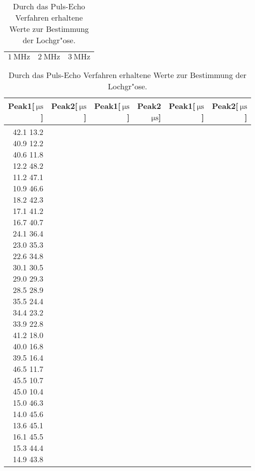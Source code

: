 
\begin{table}[!h]
\begin{center}
\begin{tabular}{|l|l|l|}
\hline
 $\SI{1}{\mega\hertz}$ & $\SI{2}{\mega\hertz}$ & $\SI{3}{\mega\hertz}$\\
\hline
\hline

\hline
\end{tabular}
\begin{tabular}{|r|r|r|r|r|r|}
\hline
Peak1[$\SI{}{\micro\second}$] & Peak2[$\SI{}{\micro\second}$] & Peak1[$\SI{}{\micro\second}$] & Peak2$\SI{}{\micro\second}$] & Peak1[$\SI{}{\micro\second}$] & Peak2[$\SI{}{\micro\second}$]\\
\hline
\hline
42.1 	13.2 	40.9 	12.2 	40.6 	11.8
12.2 	48.2 	11.2 	47.1 	10.9 	46.6
18.2 	42.3 	17.1 	41.2 	16.7 	40.7
24.1 	36.4 	23.0 	35.3 	22.6 	34.8
30.1 	30.5 	29.0 	29.3 	28.5 	28.9
35.5 	24.4 	34.4 	23.2 	33.9 	22.8
41.2 	18.0 	40.0 	16.8 	39.5 	16.4
46.5 	11.7 	45.5 	10.7 	45.0 	10.4
15.0 	46.3 	14.0 	45.6 	13.6 	45.1
16.1 	45.5 	15.3 	44.4 	14.9 	43.8
\hline
\end{tabular}
\caption[]{Durch das Puls-Echo Verfahren erhaltene Werte zur Bestimmung der Lochgr"ose.}
\label{loch1}
\end{center}
\end{table}